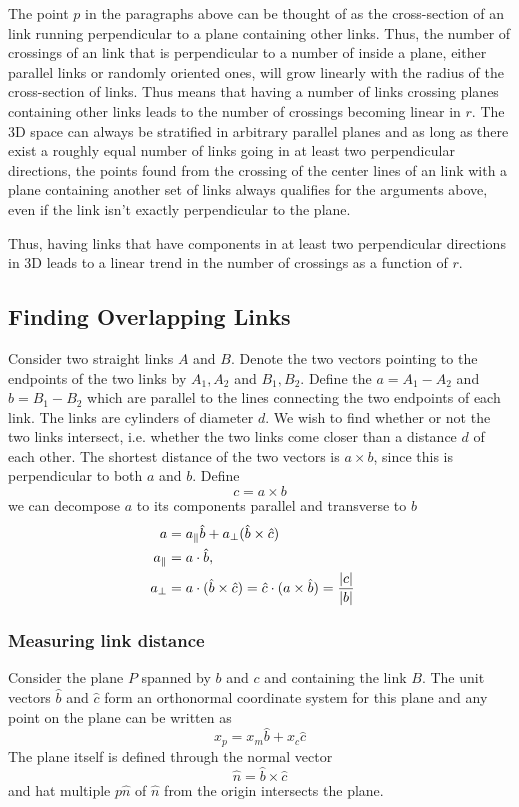 \documentclass[nofootinbib,preprint,floatfix,titlepage,superscriptaddress]{revtex4} %
\begin{document}
The point $p$ in the paragraphs above can be thought of as the cross-section of an link running perpendicular to a plane containing other links. Thus, the number of crossings of an link that is perpendicular to a number of inside a plane, either parallel links or randomly oriented ones, will grow linearly with the radius of the cross-section of links. Thus means that having a number of links crossing planes containing other links leads to the number of crossings becoming linear in $r$. The 3D space can always be stratified in arbitrary parallel planes and as long as there exist a roughly equal number of links going in at least two perpendicular directions, the points found from the crossing of the center lines of an link with a plane containing another set of links always qualifies for the arguments above, even if the link isn't exactly perpendicular to the plane. 

Thus, having links that have components in at least two perpendicular directions in 3D leads to a linear trend in the number of crossings as a function of $r$.  


\subsection{Finding Overlapping Links}
Consider two straight links $A$ and $B$. Denote the two vectors pointing to the endpoints of the two links by $A_1,A_2$ and $B_1,B_2$. Define the $a= A_1 - A_2$ and $ b= B_1 -B_2$ which are parallel to the lines connecting the two endpoints of each link. The links are cylinders of diameter $d$. We wish to find whether or not the two links intersect, i.e. whether the two links come closer than a distance $d$ of each other. The shortest distance of the two vectors is $a \times b$, since this is perpendicular to both $a$ and $b$. Define
\[c = a\times b\]
we can decompose $ a$ to its components parallel and transverse to $b$ 
\begin{align}
a &= a_\parallel \hat{b}+ a_\perp (\hat{b}\times \hat{c})\cr
a_\parallel &= a\cdot \hat{b}, \cr
a_\perp &= a \cdot (\hat{b}\times \hat{c}) = \hat{c} \cdot (a\times \hat{b})= {|c|\over |b|}
\end{align}

\subsubsection{Measuring link distance}
Consider the plane $P$ spanned by $b$ and $c$ and containing the link $B$. The unit vectors $\hat{b}$ and $\hat{c}$ form an orthonormal coordinate system for this plane and any point on the plane can be written as
\[x_p = x_m \hat{b}+ x_c\hat{c}\]
The plane itself is defined through the normal vector 
\[\hat{n}= \hat{b}\times\hat{c}\]
and hat multiple $p\hat{n}$ of $\hat{n}$ from the origin intersects the plane.
\end{document}
